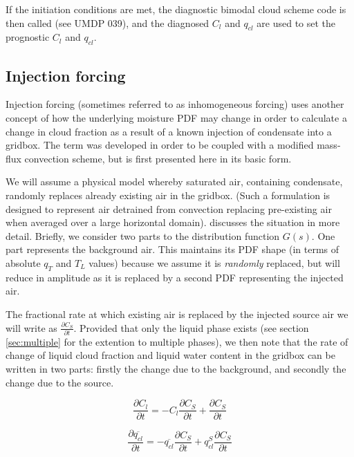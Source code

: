 \documentclass{UMDP_article}
\begin{document}
If the initiation conditions are met, the diagnostic bimodal cloud scheme code
is then called (see UMDP 039), and the diagnosed $C_l$ and $q_{cl}$ are used to
set the prognostic $C_l$ and $q_{cl}$.

\subsection{Injection forcing}
\label{sec:inhomog}

Injection forcing (sometimes referred to as inhomogeneous forcing)
uses another concept of how the underlying moisture PDF may change in
order to calculate a change in cloud fraction as a result of a known
injection of condensate into a gridbox. The term was developed in
order to be coupled with a modified mass-flux convection scheme,
but is first presented here in its basic form.

We will assume a physical model whereby saturated air, containing
condensate, randomly replaces already existing air in the gridbox.
(Such a formulation is designed to represent air detrained from convection
replacing pre-existing air when averaged over a large horizontal domain). 
\cite{bwg03} discusses the situation in more detail. Briefly,
we consider two parts to the distribution function $G(s)$. One part
represents the background air. This maintains its PDF shape (in terms
of absolute $q_T$ and $T_L$ values) because we assume it is \textit{randomly}
replaced, but will reduce in amplitude as it is replaced by a
second PDF representing the injected air.

The fractional rate at which existing air
is replaced by the injected source air we will write as
$\frac{\partial{C_S}}{\partial{t}}$. Provided that only the liquid
phase exists (see section \ref{sec:multiple} for the extention to multiple phases),
we then note that the rate
of change of liquid cloud fraction and liquid water content in
the gridbox can be written in two parts: firstly the change
due to the background, and secondly the change due to the source.

\begin{equation}
\frac{\partial{C_l}}{\partial{t}} =
- C_l \frac{\partial{C_S}}{\partial{t}} + \frac{\partial{C_S}}{\partial{t}}
\label{eq:dcdt_inhom}
\end{equation}

\begin{equation}
\frac{\partial{\overline{q_{cl}}}}{\partial{t}} =
- \overline{q_{cl}} \frac{\partial{C_S}}{\partial{t}}
+ q_{cl}^S \frac{\partial{C_S}}{\partial{t}}
\label{eq:dqcldt_inhom}
\end{equation}
\end{document}
